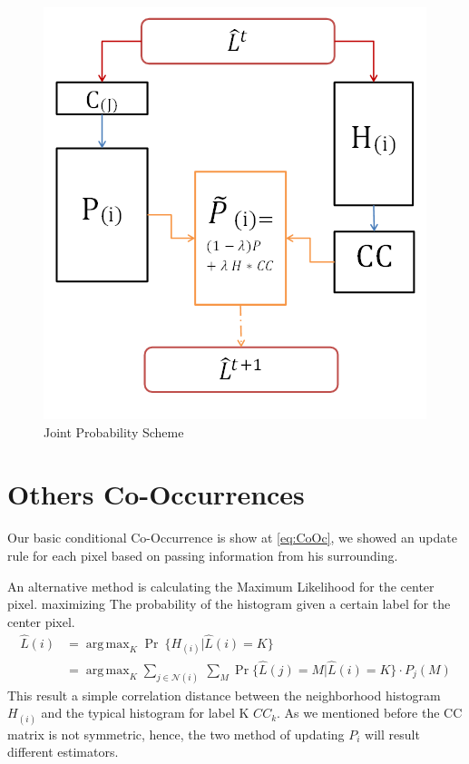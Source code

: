 \documentclass{article}
\DeclareMathOperator*{\argmax}{arg\,max}
\begin{document}


\begin{figure}[ht]
	\includegraphics[scale=1.1]{Scheme1.png}
	\caption{Joint Probability Scheme}
	\label{fig:Scheme}
\end{figure}

\section{Others Co-Occurrences}

Our basic conditional Co-Occurrence is show at \eqref{eq:CoOc}, we showed an update rule for each pixel based on passing information from his surrounding.

An alternative method is calculating the Maximum Likelihood for the center pixel. maximizing The probability of the histogram given a certain label for the center pixel.
\begin{align}
\widehat{L}(i)&=\argmax_K \Pr~\{H_{(i)}|\widehat{L}(i)=K \}\\
&=\argmax_K\sum_{j\in\mathcal{N}(i)}^{} ~\sum_{M}^{} \Pr \{\widehat{L}(j)=M|\widehat{L}(i)=K \}\cdot P_j(M) \nonumber
\end{align}
This result a simple correlation distance between the neighborhood histogram $ H_{(i)} $ and the typical histogram for label K $ CC_k $.
As we mentioned before the CC matrix is not symmetric, hence, the two method of updating $ P_{i} $ will result different estimators.
\end{document}

